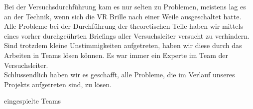 \documentclass{Bericht}
\begin{document}
Bei der Versuchsdurchführung kam es nur selten zu Problemen, meistens lag es an der Technik, wenn sich die VR Brille nach einer Weile ausgeschaltet hatte. Alle Probleme bei der Durchführung der theoretischen Teile haben wir mittels eines vorher durchgeührten Briefings aller Versuchsleiter versucht zu verhindern. Sind trotzdem kleine Unstimmigkeiten aufgetreten, haben wir diese durch das Arbeiten in Teams lösen können. Es war immer ein Experte im Team der Versuchsleiter. \\
Schlussendlich haben wir es geschafft, alle Probleme, die im Verlauf unseres Projekts aufgetreten sind, zu lösen.

eingespielte Teams



\end{document}
